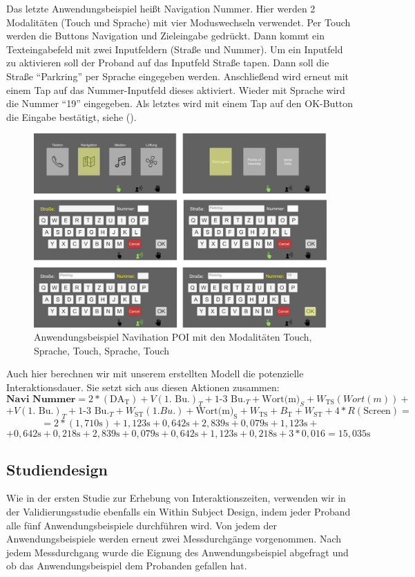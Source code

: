 Das letzte Anwendungsbeispiel heißt Navigation Nummer. Hier werden 2 Modalitäten (Touch und Sprache) mit vier Moduswechseln verwendet. Per Touch werden die Buttons Navigation und Zieleingabe gedrückt. Dann kommt ein Texteingabefeld mit zwei Inputfeldern (Straße und Nummer). Um ein Inputfeld zu aktivieren soll der Proband auf das Inputfeld Straße tapen. Dann soll die Straße "`Parkring"' per Sprache eingegeben werden. Anschließend wird erneut mit einem Tap auf das Nummer-Inputfeld	dieses aktiviert. Wieder mit Sprache wird die Nummer "`19"' eingegeben. Als letztes wird mit einem Tap auf den OK-Button die Eingabe bestätigt, siehe ().
\begin{figure}
	\centering
		\includegraphics[width=1\textwidth]{img/UseCases_Eval_Navi_Nummer.jpg}
	\caption{Anwendungsbeispiel Navihation POI mit den Modalitäten Touch, Sprache, Touch, Sprache, Touch}
	\label{fig:UseCasesEvalNaviNummer}
\end{figure}	
Auch hier berechnen wir mit unserem erstellten Modell die potenzielle Interaktionsdauer. Sie setzt sich aus diesen Aktionen zusammen:
\[
\textbf{Navi Nummer} = 2*(\text{DA}_\text{T}) + V(\text{1. Bu.})_T + \text{1-3 Bu.}_T + \text{Wort(m)}_S + W_\text{TS}(Wort(m)) +
\]
\[
+ V(\text{1. Bu.})_T + \text{1-3 Bu.}_T + W_\text{ST}(1. Bu.) + \text{Wort(m)}_\text{S} + W_\text{TS} + B_\text{T} + W_\text{ST} + 4*R(\text{Screen}) =
\]
\[
= 2*( 1,710\text{s}) +  1,123\text{s} + 0,642\text{s} + 2,839\text{s} + 0,079\text{s} + 1,123\text{s} + 
\]
\[
+ 0,642\text{s} + 0,218\text{s} + 2,839\text{s} + 0,079\text{s} + 0,642\text{s} + 1,123\text{s} + 0,218\text{s} + 3*0,016 = 15,035\text{s}
\]


\subsection[Studiendesign]{Studiendesign}
Wie in der ersten Studie zur Erhebung von Interaktionszeiten, verwenden wir in der Validierungsstudie ebenfalls ein Within Subject Design, indem jeder Proband alle fünf Anwendungsbeispiele durchführen wird. 
Von jedem der Anwendungsbeispiele werden erneut zwei Messdurchgänge vorgenommen. 
Nach jedem Messdurchgang wurde die Eignung des Anwendungsbeispiel abgefragt und ob das Anwendungsbeispiel dem Probanden gefallen hat.

